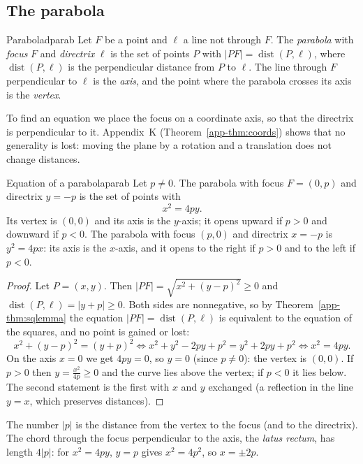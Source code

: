 \documentclass[11pt]{article}
\begin{document}
\subsection*{The parabola}

\begin{defn}{Parabola}{dparab}
Let $F$ be a point and $\ell$ a line not through $F$. The \emph{parabola} with \emph{focus} $F$ and \emph{directrix} $\ell$ is the set of points $P$ with $\lvert PF\rvert=\operatorname{dist}(P,\ell)$, where $\operatorname{dist}(P,\ell)$ is the perpendicular distance from $P$ to $\ell$. The line through $F$ perpendicular to $\ell$ is the \emph{axis}, and the point where the parabola crosses its axis is the \emph{vertex}.
\end{defn}

To find an equation we place the focus on a coordinate axis, so that the directrix is perpendicular to it. Appendix~K (Theorem~\ref{app-thm:coords}) shows that no generality is lost: moving the plane by a rotation and a translation does not change distances.

\begin{thm}{Equation of a parabola}{parab}
Let $p\ne0$. The parabola with focus $F=(0,p)$ and directrix $y=-p$ is the set of points with
\[
x^2=4py .
\]
Its vertex is $(0,0)$ and its axis is the $y$-axis; it opens upward if $p>0$ and downward if $p<0$. The parabola with focus $(p,0)$ and directrix $x=-p$ is $y^2=4px$: its axis is the $x$-axis, and it opens to the right if $p>0$ and to the left if $p<0$.
\end{thm}
\begin{proof}
Let $P=(x,y)$. Then $\lvert PF\rvert=\sqrt{x^2+(y-p)^2}\ge0$ and $\operatorname{dist}(P,\ell)=\lvert y+p\rvert\ge0$. Both sides are nonnegative, so by Theorem~\ref{app-thm:sqlemma} the equation $\lvert PF\rvert=\operatorname{dist}(P,\ell)$ is equivalent to the equation of the squares, and no point is gained or lost:
\[
x^2+(y-p)^2=(y+p)^2\iff x^2+y^2-2py+p^2=y^2+2py+p^2\iff x^2=4py .
\]
On the axis $x=0$ we get $4py=0$, so $y=0$ (since $p\ne0$): the vertex is $(0,0)$. If $p>0$ then $y=\frac{x^2}{4p}\ge0$ and the curve lies above the vertex; if $p<0$ it lies below. The second statement is the first with $x$ and $y$ exchanged (a reflection in the line $y=x$, which preserves distances).
\end{proof}

The number $\lvert p\rvert$ is the distance from the vertex to the focus (and to the directrix). The chord through the focus perpendicular to the axis, the \emph{latus rectum}, has length $4\lvert p\rvert$: for $x^2=4py$, $y=p$ gives $x^2=4p^2$, so $x=\pm2p$.
\end{document}
